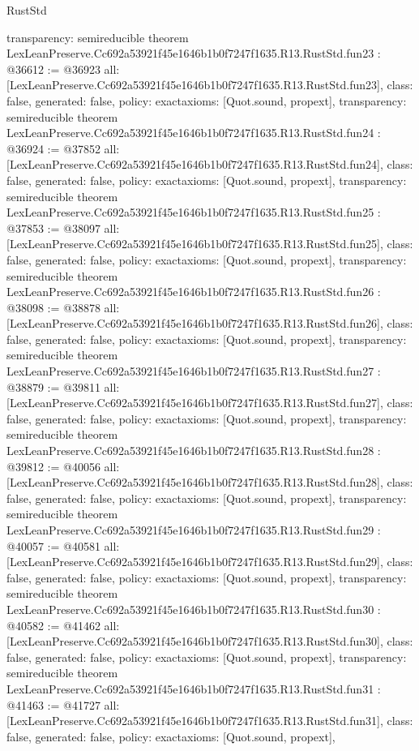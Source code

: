 \begin{lexlean}{RustStd}
\begin{coremodule}
{  transparency: semireducible
}
theorem LexLeanPreserve.Cc692a53921f45e1646b1b0f7247f1635.R13.RustStd.fun23 : @36612 := @36923 {
  all: [LexLeanPreserve.Cc692a53921f45e1646b1b0f7247f1635.R13.RustStd.fun23],
  class: false,
  generated: false,
  policy: exact{axioms: [Quot.sound, propext]},
  transparency: semireducible
}
theorem LexLeanPreserve.Cc692a53921f45e1646b1b0f7247f1635.R13.RustStd.fun24 : @36924 := @37852 {
  all: [LexLeanPreserve.Cc692a53921f45e1646b1b0f7247f1635.R13.RustStd.fun24],
  class: false,
  generated: false,
  policy: exact{axioms: [Quot.sound, propext]},
  transparency: semireducible
}
theorem LexLeanPreserve.Cc692a53921f45e1646b1b0f7247f1635.R13.RustStd.fun25 : @37853 := @38097 {
  all: [LexLeanPreserve.Cc692a53921f45e1646b1b0f7247f1635.R13.RustStd.fun25],
  class: false,
  generated: false,
  policy: exact{axioms: [Quot.sound, propext]},
  transparency: semireducible
}
theorem LexLeanPreserve.Cc692a53921f45e1646b1b0f7247f1635.R13.RustStd.fun26 : @38098 := @38878 {
  all: [LexLeanPreserve.Cc692a53921f45e1646b1b0f7247f1635.R13.RustStd.fun26],
  class: false,
  generated: false,
  policy: exact{axioms: [Quot.sound, propext]},
  transparency: semireducible
}
theorem LexLeanPreserve.Cc692a53921f45e1646b1b0f7247f1635.R13.RustStd.fun27 : @38879 := @39811 {
  all: [LexLeanPreserve.Cc692a53921f45e1646b1b0f7247f1635.R13.RustStd.fun27],
  class: false,
  generated: false,
  policy: exact{axioms: [Quot.sound, propext]},
  transparency: semireducible
}
theorem LexLeanPreserve.Cc692a53921f45e1646b1b0f7247f1635.R13.RustStd.fun28 : @39812 := @40056 {
  all: [LexLeanPreserve.Cc692a53921f45e1646b1b0f7247f1635.R13.RustStd.fun28],
  class: false,
  generated: false,
  policy: exact{axioms: [Quot.sound, propext]},
  transparency: semireducible
}
theorem LexLeanPreserve.Cc692a53921f45e1646b1b0f7247f1635.R13.RustStd.fun29 : @40057 := @40581 {
  all: [LexLeanPreserve.Cc692a53921f45e1646b1b0f7247f1635.R13.RustStd.fun29],
  class: false,
  generated: false,
  policy: exact{axioms: [Quot.sound, propext]},
  transparency: semireducible
}
theorem LexLeanPreserve.Cc692a53921f45e1646b1b0f7247f1635.R13.RustStd.fun30 : @40582 := @41462 {
  all: [LexLeanPreserve.Cc692a53921f45e1646b1b0f7247f1635.R13.RustStd.fun30],
  class: false,
  generated: false,
  policy: exact{axioms: [Quot.sound, propext]},
  transparency: semireducible
}
theorem LexLeanPreserve.Cc692a53921f45e1646b1b0f7247f1635.R13.RustStd.fun31 : @41463 := @41727 {
  all: [LexLeanPreserve.Cc692a53921f45e1646b1b0f7247f1635.R13.RustStd.fun31],
  class: false,
  generated: false,
  policy: exact{axioms: [Quot.sound, propext]},
}
\end{coremodule}
\end{lexlean}
